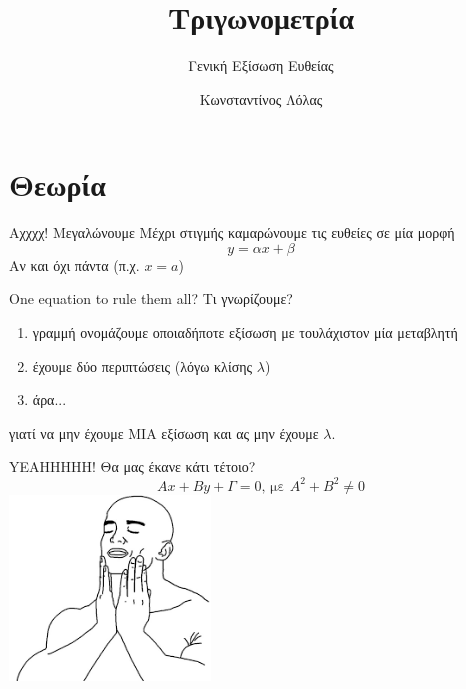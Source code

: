 \documentclass[greek]{beamer}
\title{Τριγωνομετρία}
\subtitle{Γενική Εξίσωση Ευθείας}
\author[Λόλας]{Κωνσταντίνος Λόλας}
\date{}
\begin{document}
\begin{frame}
 \titlepage
\end{frame}

\section{Θεωρία}
\begin{frame}{Αχχχχ! Μεγαλώνουμε}
 Μέχρι στιγμής καμαρώνουμε τις ευθείες σε μία μορφή
 $$y=αx+β$$
  Αν και όχι πάντα (π.χ. $x=a$)
\end{frame}

\begin{frame}{One equation to rule them all?}
 Τι γνωρίζουμε?
 \begin{enumerate}
  \item<1-> γραμμή ονομάζουμε οποιαδήποτε εξίσωση με τουλάχιστον μία μεταβλητή
  \item<2-> έχουμε δύο περιπτώσεις (λόγω κλίσης $λ$)
  \item<3-> άρα...
 \end{enumerate}
  γιατί να μην έχουμε ΜΙΑ εξίσωση και ας μην έχουμε $λ$.
 \centering

\end{frame}

\begin{frame}{YEAHHHHH!}
 Θα μας έκανε κάτι τέτοιο?
 $$Αx+Βy+Γ=0 \text{, με } Α^2+Β^2\ne 0$$
 \centering
 \includegraphics[width=0.4\textwidth]{"../images/feelsgood.png"}
\end{frame}
\end{document}
